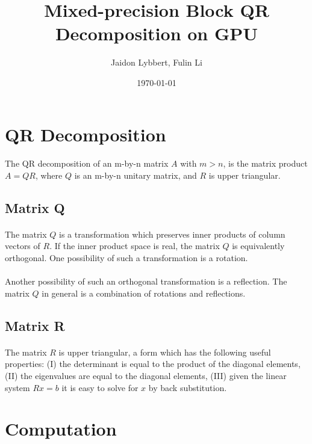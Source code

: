 \documentclass{article}
\title{Mixed-precision Block QR Decomposition on GPU}
\author{Jaidon Lybbert, Fulin Li}
\date{\today{}}
\begin{document}
\maketitle{}
\tableofcontents{}

\section{QR Decomposition}
\paragraph{}
The QR decomposition of an m-by-n matrix $A$ with $m>n$, is the matrix product $A = QR$, where $Q$ is an 
m-by-n unitary matrix, and $R$ is upper triangular.

\subsection{Matrix Q}
\paragraph{}
The matrix $Q$ is a transformation which preserves inner products of column vectors of $R$. If the 
inner product space is real, the matrix $Q$ is equivalently orthogonal. One possibility of such a 
transformation is a rotation.
\paragraph{}
Another possibility of such an orthogonal transformation is a reflection. The matrix $Q$ in general 
is a combination of rotations and reflections.

\subsection{Matrix R}
\paragraph{}
The matrix $R$ is upper triangular, a form which has the following useful properties: (I) the determinant is equal to the product of the diagonal elements, (II) the eigenvalues are equal to the diagonal elements, (III) given the linear system $Rx = b$ it is easy to solve for $x$ by back substitution.

\section{Computation}
\end{document}
